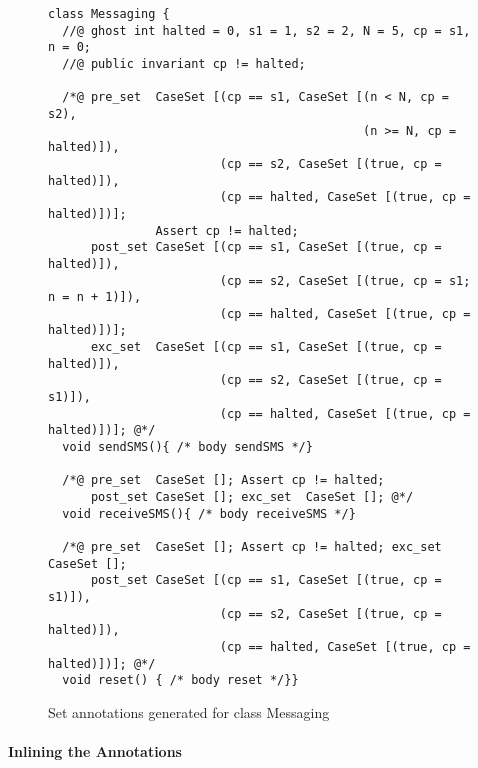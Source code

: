 \begin{figure}[t]
{\small\begin{verbatim}
class Messaging {
  //@ ghost int halted = 0, s1 = 1, s2 = 2, N = 5, cp = s1, n = 0;
  //@ public invariant cp != halted;

  /*@ pre_set  CaseSet [(cp == s1, CaseSet [(n < N, cp = s2),
                                            (n >= N, cp = halted)]),
                        (cp == s2, CaseSet [(true, cp = halted)]),
                        (cp == halted, CaseSet [(true, cp = halted)])];
               Assert cp != halted;
      post_set CaseSet [(cp == s1, CaseSet [(true, cp = halted)]),
                        (cp == s2, CaseSet [(true, cp = s1; n = n + 1)]),
                        (cp == halted, CaseSet [(true, cp = halted)])];
      exc_set  CaseSet [(cp == s1, CaseSet [(true, cp = halted)]),
                        (cp == s2, CaseSet [(true, cp = s1)]),
                        (cp == halted, CaseSet [(true, cp = halted)])]; @*/
  void sendSMS(){ /* body sendSMS */}

  /*@ pre_set  CaseSet []; Assert cp != halted; 
      post_set CaseSet []; exc_set  CaseSet []; @*/
  void receiveSMS(){ /* body receiveSMS */}

  /*@ pre_set  CaseSet []; Assert cp != halted; exc_set CaseSet [];
      post_set CaseSet [(cp == s1, CaseSet [(true, cp = s1)]),
                        (cp == s2, CaseSet [(true, cp = halted)]),
                        (cp == halted, CaseSet [(true, cp = halted)])]; @*/
  void reset() { /* body reset */}}\end{verbatim}}
\caption{Set annotations generated for class Messaging}\label{FigExampleStep2}
\end{figure}



\paragraph{Inlining the Annotations}


